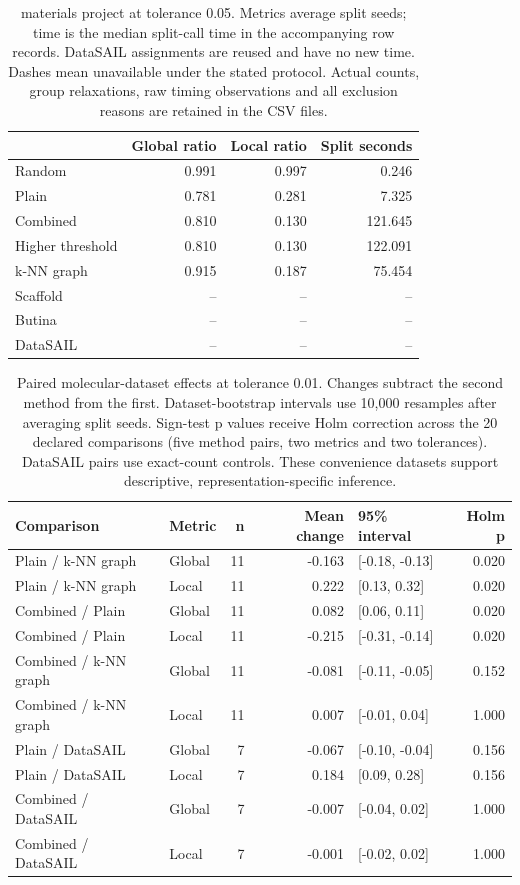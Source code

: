 \begin{table}[htbp]\centering\small
\begin{tabular}{lrrr}
\toprule
 & Global ratio & Local ratio & Split seconds \\
\midrule
Random & 0.991 & 0.997 & 0.246 \\
Plain & 0.781 & 0.281 & 7.325 \\
Combined & 0.810 & 0.130 & 121.645 \\
Higher threshold & 0.810 & 0.130 & 122.091 \\
k-NN graph & 0.915 & 0.187 & 75.454 \\
Scaffold & -- & -- & -- \\
Butina & -- & -- & -- \\
DataSAIL & -- & -- & -- \\
\bottomrule
\end{tabular}

\caption{materials project at tolerance 0.05. Metrics average split seeds; time is the median split-call time in the accompanying row records. DataSAIL assignments are reused and have no new time. Dashes mean unavailable under the stated protocol. Actual counts, group relaxations, raw timing observations and all exclusion reasons are retained in the CSV files.}\end{table}
\begin{table}[htbp]\centering\small
\begin{tabular}{llrrlr}
\toprule
Comparison & Metric & n & Mean change & 95\% interval & Holm p \\
\midrule
Plain / k-NN graph & Global & 11 & -0.163 & [-0.18, -0.13] & 0.020 \\
Plain / k-NN graph & Local & 11 & 0.222 & [0.13, 0.32] & 0.020 \\
Combined / Plain & Global & 11 & 0.082 & [0.06, 0.11] & 0.020 \\
Combined / Plain & Local & 11 & -0.215 & [-0.31, -0.14] & 0.020 \\
Combined / k-NN graph & Global & 11 & -0.081 & [-0.11, -0.05] & 0.152 \\
Combined / k-NN graph & Local & 11 & 0.007 & [-0.01, 0.04] & 1.000 \\
Plain / DataSAIL & Global & 7 & -0.067 & [-0.10, -0.04] & 0.156 \\
Plain / DataSAIL & Local & 7 & 0.184 & [0.09, 0.28] & 0.156 \\
Combined / DataSAIL & Global & 7 & -0.007 & [-0.04, 0.02] & 1.000 \\
Combined / DataSAIL & Local & 7 & -0.001 & [-0.02, 0.02] & 1.000 \\
\bottomrule
\end{tabular}

\caption{Paired molecular-dataset effects at tolerance 0.01. Changes subtract the second method from the first. Dataset-bootstrap intervals use 10,000 resamples after averaging split seeds. Sign-test p values receive Holm correction across the 20 declared comparisons (five method pairs, two metrics and two tolerances). DataSAIL pairs use exact-count controls. These convenience datasets support descriptive, representation-specific inference.}\end{table}
